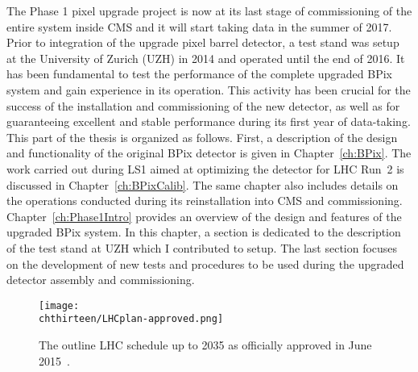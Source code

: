 The Phase 1 pixel upgrade project is now at its last stage of commissioning of the entire system inside CMS and it will start taking data in the summer of 2017.
Prior to integration of the upgrade pixel barrel detector, a test stand was setup at the University of Zurich (UZH) in 2014 and operated until the end of 2016. It has been fundamental to test the performance of the complete upgraded BPix system and gain experience in its operation. This activity has been crucial for the success of the installation and commissioning of the new detector, as well as for guaranteeing excellent and stable performance during its first year of data-taking.\\

This part of the thesis is organized as follows.
First, a description of the design and functionality of the original BPix detector is given in Chapter~\ref{ch:BPix}.
The work carried out during LS1 aimed at optimizing the detector for LHC Run~2 is discussed in Chapter~\ref{ch:BPixCalib}.
The same chapter also includes details on the operations conducted during its reinstallation into CMS and commissioning.
Chapter~\ref{ch:Phase1Intro} provides an overview of the design and features of the upgraded BPix system.
In this chapter, a section is dedicated to the description of the test stand at UZH which I contributed to setup.
The last section focuses on the development of new tests and procedures to be used during the upgraded detector assembly and commissioning.

\begin{figure}[!t]
 \begin{center}
 \texttt{[image: \\chthirteen/LHCplan-approved.png]}
 \end{center}
 \caption{The outline LHC schedule up to 2035 as officially approved in June 2015~\cite{LHCpage}.}
 \label{fig:LHCplan}
\end{figure}